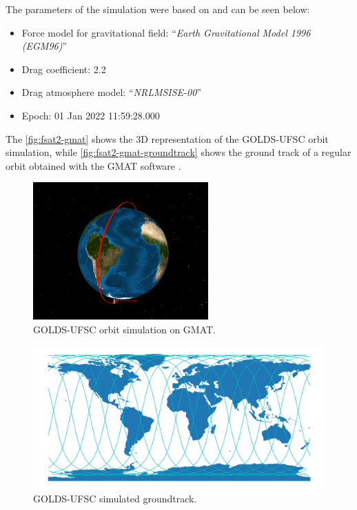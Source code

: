 The parameters of the simulation were based on \cite{en13246691} and can be seen below:

\begin{itemize}
    \item Force model for gravitational field: ``\textit{Earth Gravitational Model 1996 (EGM96)}''
    \item Drag coefficient: 2.2
    \item Drag atmosphere model: ``\textit{NRLMSISE-00}''
    \item Epoch: 01 Jan 2022 11:59:28.000
\end{itemize}

The \autoref{fig:fsat2-gmat} shows the 3D representation of the GOLDS-UFSC orbit simulation, while \autoref{fig:fsat2-gmat-groundtrack} shows the ground track of a regular orbit obtained with the GMAT software \cite{gmat}.

\begin{figure}[!ht]
    \begin{center}
        \includegraphics[width=0.6\textwidth]{figures/fsat2-gmat.png}
        \caption{GOLDS-UFSC orbit simulation on GMAT.}
        \label{fig:fsat2-gmat}
    \end{center}
\end{figure}

\begin{figure}[!ht]
    \begin{center}
        \includegraphics[width=\textwidth]{figures/fsat2-gmat-groundtrack.pdf}
        \caption{GOLDS-UFSC simulated groundtrack.}
        \label{fig:fsat2-gmat-groundtrack}
    \end{center}
\end{figure}

